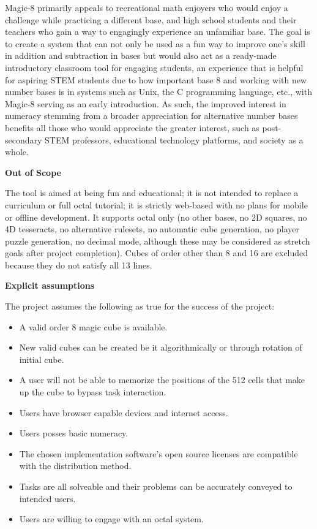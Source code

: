 \documentclass[12pt]{article}
\begin{document}
Magic-8 primarily appeals to recreational math enjoyers who would enjoy a challenge while practicing a different base, and high school students and their teachers who gain a way to engagingly experience an unfamiliar base.
The goal is to create a system that can not only be used as a fun way to improve one's skill in addition and subtraction in bases but would also act as a ready-made introductory classroom tool for engaging students,
an experience that is helpful for aspiring STEM students due to how important base 8 and working with new number bases is in systems such as Unix, the C programming language, etc., with Magic-8 serving as an early introduction. As such,
the improved interest in numeracy stemming from a broader appreciation for alternative number bases benefits all those who would appreciate the greater interest, such as
post-secondary STEM professors, educational technology platforms, and society as a whole.

\textbf{Out of Scope}

The tool is aimed at being fun and educational; it is not intended to replace a curriculum or full octal tutorial; it is strictly web-based with no plans for mobile or offline development.
It supports octal only (no other bases, no 2D squares, no 4D tesseracts, no alternative rulesets, no automatic cube generation, no player puzzle generation, no decimal mode, although these may be considered as stretch goals after project completion).
Cubes of order other than 8 and 16 are excluded because they do not satisfy all 13 lines.

\textbf{Explicit assumptions}

The project assumes the following as true for the success of the project:
\begin{itemize}
\item A valid order 8 magic cube is available.
\item New valid cubes can be created be it algorithmically or through rotation of initial cube.
\item A user will not be able to memorize the positions of the 512 cells that make up the cube to bypass task interaction.
\item Users have browser capable devices and internet access.
\item Users posses basic numeracy.
\item The chosen implementation software's open source licenses are compatible with the distribution method.
\item Tasks are all solveable and their problems can be accurately conveyed to intended users.
\item Users are willing to engage with an octal system.
\end{itemize}
\end{document}

